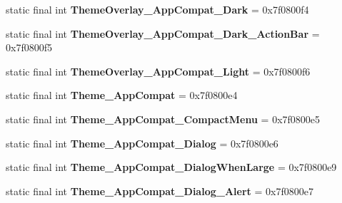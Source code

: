 \begin{DoxyCompactItemize}
\item 
\hypertarget{classandroid_1_1support_1_1design_1_1_r_1_1style_a66d45e018d9ab21755dd3dfe91aa7f0a}{}static final int {\bfseries Theme\+Overlay\+\_\+\+App\+Compat\+\_\+\+Dark} = 0x7f0800f4\label{classandroid_1_1support_1_1design_1_1_r_1_1style_a66d45e018d9ab21755dd3dfe91aa7f0a}

\item 
\hypertarget{classandroid_1_1support_1_1design_1_1_r_1_1style_aa195b492725c39a7a365b9270076be81}{}static final int {\bfseries Theme\+Overlay\+\_\+\+App\+Compat\+\_\+\+Dark\+\_\+\+Action\+Bar} = 0x7f0800f5\label{classandroid_1_1support_1_1design_1_1_r_1_1style_aa195b492725c39a7a365b9270076be81}

\item 
\hypertarget{classandroid_1_1support_1_1design_1_1_r_1_1style_ae7401b46ade43c0f9362b4284f5ea048}{}static final int {\bfseries Theme\+Overlay\+\_\+\+App\+Compat\+\_\+\+Light} = 0x7f0800f6\label{classandroid_1_1support_1_1design_1_1_r_1_1style_ae7401b46ade43c0f9362b4284f5ea048}

\item 
\hypertarget{classandroid_1_1support_1_1design_1_1_r_1_1style_a47abe16cf2c44a07f0ea97b28021e096}{}static final int {\bfseries Theme\+\_\+\+App\+Compat} = 0x7f0800e4\label{classandroid_1_1support_1_1design_1_1_r_1_1style_a47abe16cf2c44a07f0ea97b28021e096}

\item 
\hypertarget{classandroid_1_1support_1_1design_1_1_r_1_1style_af28bb64d8932aa6cd8d8b7c0dce5dc85}{}static final int {\bfseries Theme\+\_\+\+App\+Compat\+\_\+\+Compact\+Menu} = 0x7f0800e5\label{classandroid_1_1support_1_1design_1_1_r_1_1style_af28bb64d8932aa6cd8d8b7c0dce5dc85}

\item 
\hypertarget{classandroid_1_1support_1_1design_1_1_r_1_1style_a68e5f0f49f3cbc58cb530e3977ba8d85}{}static final int {\bfseries Theme\+\_\+\+App\+Compat\+\_\+\+Dialog} = 0x7f0800e6\label{classandroid_1_1support_1_1design_1_1_r_1_1style_a68e5f0f49f3cbc58cb530e3977ba8d85}

\item 
\hypertarget{classandroid_1_1support_1_1design_1_1_r_1_1style_a53b0b06f59f50b329442743a580079d5}{}static final int {\bfseries Theme\+\_\+\+App\+Compat\+\_\+\+Dialog\+When\+Large} = 0x7f0800e9\label{classandroid_1_1support_1_1design_1_1_r_1_1style_a53b0b06f59f50b329442743a580079d5}

\item 
\hypertarget{classandroid_1_1support_1_1design_1_1_r_1_1style_ad919dfbf7c746414e586fcc4092892ec}{}static final int {\bfseries Theme\+\_\+\+App\+Compat\+\_\+\+Dialog\+\_\+\+Alert} = 0x7f0800e7\label{classandroid_1_1support_1_1design_1_1_r_1_1style_ad919dfbf7c746414e586fcc4092892ec}


\end{DoxyCompactItemize}
